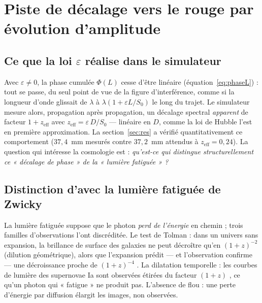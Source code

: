\section{Piste de décalage vers le rouge par évolution d'amplitude}\label{sec:redshift}

\subsection{Ce que la loi $\varepsilon$ réalise dans le simulateur}

Avec $\varepsilon \ne 0$, la phase cumulée $\Phi(L)$ cesse d'être linéaire
(équation~\eqref{eq:phaseL}) : tout se passe, du seul point de vue de la figure
d'interférence, comme si la longueur d'onde glissait de $\lambda$ à
$\lambda(1 + \varepsilon L/S_0)$ le long du trajet. Le simulateur mesure alors,
propagation après propagation, un décalage spectral \emph{apparent} de facteur
$1 + z_{\mathrm{eff}}$ avec $z_{\mathrm{eff}} = \varepsilon\,D/S_0$
--- linéaire en $D$, comme la loi de Hubble l'est en première approximation.
La section~\ref{sec:res} a vérifié quantitativement ce comportement
($37{,}4$~mm mesurés contre $37{,}2$~mm attendus à $z_{\mathrm{eff}} = 0{,}24$).
La question qui intéresse la cosmologie est : \emph{qu'est-ce qui distingue
structurellement ce « décalage de phase » de la « lumière fatiguée » ?}

\subsection{Distinction d'avec la lumière fatiguée de Zwicky}

La lumière fatiguée suppose que le photon \emph{perd de l'énergie} en chemin
\cite{zwicky1929} ; trois familles d'observations l'ont discréditée. Le test de
Tolman : dans un univers sans expansion, la brillance de surface des galaxies ne
peut décroître qu'en $(1+z)^{-2}$ (dilution géométrique), alors que
l'expansion prédit --- et l'observation confirme --- une décroissance proche de
$(1+z)^{-4}$ \cite{lubin2001}. La dilatation temporelle : les courbes de lumière
des supernovae Ia sont observées étirées du facteur $(1+z)$
\cite{leibundgut1996}, ce qu'un photon qui « fatigue » ne produit pas. L'absence
de flou : une perte d'énergie par diffusion élargit les images, non observées.

